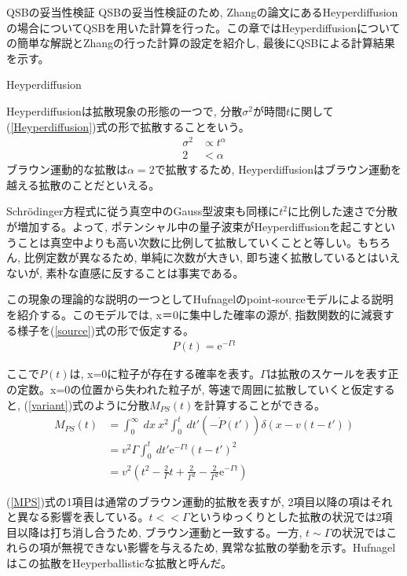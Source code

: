 \documentclass[a4paper, lualatex]{bxjsarticle}
\newcommand{\eref}[1]{(\ref{#1})式}
\begin{document}
\begin{section}{QSBの妥当性検証}
    QSBの妥当性検証のため, Zhangの論文にあるHeyperdiffusionの場合についてQSBを用いた計算を行った。この章ではHeyperdiffusionについての簡単な解説とZhangの行った計算の設定を紹介し, 最後にQSBによる計算結果を示す。

    \begin{subsection}{Heyperdiffusion}
        \par Heyperdiffusionは拡散現象の形態の一つで, 分散$\sigma^2$が時間$t$に関して\eref{Heyperdiffusion}の形で拡散することをいう。
        \begin{align}
            \sigma^2 &\propto t^\alpha \label{Heyperdiffusion}\\
            2 &< \alpha
        \end{align}
        ブラウン運動的な拡散は$\alpha=2$で拡散するため, Heyperdiffusionはブラウン運動を越える拡散のことだといえる。
        \par Schrödinger方程式に従う真空中のGauss型波束も同様に$t^2$に比例した速さで分散が増加する。よって, ポテンシャル中の量子波束がHeyperdiffusionを起こすということは真空中よりも高い次数に比例して拡散していくことと等しい。もちろん, 比例定数が異なるため, 単純に次数が大きい, 即ち速く拡散しているとはいえないが, 素朴な直感に反することは事実である。
        \par この現象の理論的な説明の一つとしてHufnagel\cite{Huf}のpoint-sourceモデルによる説明を紹介する。このモデルでは, x＝0に集中した確率の源が, 指数関数的に減衰する様子を\eref{source}の形で仮定する。
        \begin{align}
            P(t) = \mathrm{e}^{-\Gamma t}\label{source}
        \end{align}
        \par ここで$P(t)$は, x=0に粒子が存在する確率を表す。$\Gamma$は拡散のスケールを表す正の定数。x=0の位置から失われた粒子が, 等速で周囲に拡散していくと仮定すると, \eref{variant}のように分散$M_{PS}(t)$を計算することができる。
        \begin{align}
            M_{PS}(t)&=\int_{0}^{\infty}\:dx\:x^2\int_{0}^{t}\:dt'(-\dot{P}(t'))\delta(x-v(t-t'))\label{variant}\\
            &=v^2\Gamma\int_{0}^{t}\:dt'\mathrm{e}^{-\Gamma t}(t-t')^2\nonumber\\
            &=v^2\left(t^2-\frac{2}{\Gamma}t+\frac{2}{\Gamma^2}-\frac{2}{\Gamma^2}\mathrm{e}^{-\Gamma t} \right)\label{MPS}
        \end{align}
        \par \eref{MPS}の1項目は通常のブラウン運動的拡散を表すが, 2項目以降の項はそれと異なる影響を表している。$t<<\Gamma$というゆっくりとした拡散の状況では2項目以降は打ち消し合うため, ブラウン運動と一致する。一方, $t\sim\Gamma$の状況ではこれらの項が無視できない影響を与えるため, 異常な拡散の挙動を示す。Hufnagelはこの拡散をHeyperballisticな拡散と呼んだ。
    \end{subsection}


\end{section}
\end{document}
